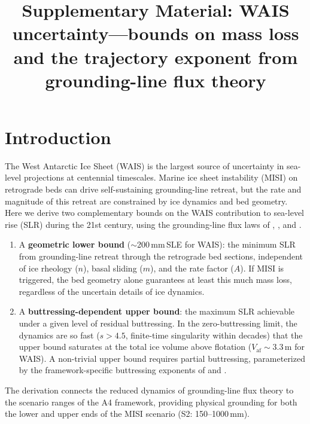 \documentclass[11pt]{article}
\title{Supplementary Material: WAIS uncertainty---bounds on mass loss\\and the trajectory exponent from grounding-line flux theory}
\author{}
\date{}
\newcommand{\Vaf}{V_{\mathrm{af}}}
\begin{document}
\maketitle

\section{Introduction}

The West Antarctic Ice Sheet (WAIS) is the largest source of uncertainty in sea-level projections at centennial timescales. Marine ice sheet instability (MISI) on retrograde beds can drive self-sustaining grounding-line retreat, but the rate and magnitude of this retreat are constrained by ice dynamics and bed geometry. Here we derive two complementary bounds on the WAIS contribution to sea-level rise (SLR) during the 21st century, using the grounding-line flux laws of \citet{Schoof2007}, \citet{Pegler2018}, and \citet{HaseloffSergienko2018}.

\begin{enumerate}
	\item A \textbf{geometric lower bound} ($\sim$200\,mm\,SLE for WAIS): the minimum SLR from grounding-line retreat through the retrograde bed sections, independent of ice rheology ($n$), basal sliding ($m$), and the rate factor ($A$). If MISI is triggered, the bed geometry alone guarantees at least this much mass loss, regardless of the uncertain details of ice dynamics.

	\item A \textbf{buttressing-dependent upper bound}: the maximum SLR achievable under a given level of residual buttressing. In the zero-buttressing limit, the dynamics are so fast ($s > 4.5$, finite-time singularity within decades) that the upper bound saturates at the total ice volume above flotation ($\Vaf \sim 3.3$\,m for WAIS). A non-trivial upper bound requires partial buttressing, parameterized by the framework-specific buttressing exponents of \citet{Pegler2018} and \citet{HaseloffSergienko2018}.
\end{enumerate}

The derivation connects the reduced dynamics of grounding-line flux theory to the scenario ranges of the A4 framework, providing physical grounding for both the lower and upper ends of the MISI scenario (S2: 150--1000\,mm).


\end{document}
